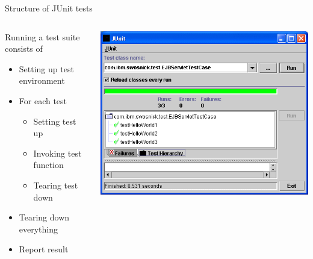 \begin{frame}{Structure of JUnit tests}
  \begin{columns}
    \begin{column}{.5\linewidth}
      \begin{block}{Running a test suite consists of}
        \begin{itemize}
        \item Setting up test environment
        \item For each test
          \begin{itemize}
          \item Setting test up
          \item Invoking test function
          \item Tearing test down
          \end{itemize}
        \item Tearing down everything
        \item Report result
        \end{itemize}
      \end{block}      
    \end{column}

    \begin{column}{.5\linewidth}
      \includegraphics[width=\linewidth]{img/junit.png}
    \end{column}
  \end{columns}
\end{frame}

